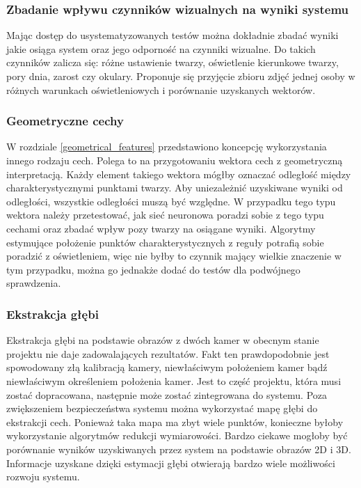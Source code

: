 \documentclass[oneside, eng]{mgr}
\begin{document}
\subsubsection{Zbadanie wpływu czynników wizualnych na wyniki systemu}
Mając dostęp do usystematyzowanych testów można dokładnie zbadać wyniki jakie osiąga system oraz jego odporność na czynniki wizualne. Do takich czynników zalicza się: różne ustawienie twarzy, oświetlenie kierunkowe twarzy, pory dnia, zarost czy okulary. Proponuje się przyjęcie zbioru zdjęć jednej osoby w różnych warunkach oświetleniowych i porównanie uzyskanych wektorów.

\subsubsection{Geometryczne cechy}
W rozdziale \ref{geometrical_features} przedstawiono koncepcję wykorzystania innego rodzaju cech. Polega to na przygotowaniu wektora cech z geometryczną interpretacją. Każdy element takiego wektora mógłby oznaczać odległość między charakterystycznymi punktami twarzy. Aby uniezależnić uzyskiwane wyniki od odległości, wszystkie odległości muszą być względne. W przypadku tego typu wektora należy przetestować, jak sieć neuronowa poradzi sobie z tego typu cechami oraz zbadać wpływ pozy twarzy na osiągane wyniki. Algorytmy estymujące położenie punktów charakterystycznych z reguły potrafią sobie poradzić z oświetleniem, więc nie byłby to czynnik mający wielkie znaczenie w tym przypadku, można go jednakże dodać do testów dla podwójnego sprawdzenia.

\subsubsection{Ekstrakcja głębi}
Ekstrakcja głębi na podstawie obrazów z dwóch kamer w obecnym stanie projektu nie daje zadowalających rezultatów. Fakt ten prawdopodobnie jest spowodowany złą kalibracją kamery, niewłaściwym położeniem kamer bądź niewłaściwym określeniem położenia kamer. Jest to część projektu, która musi zostać dopracowana, następnie może zostać zintegrowana do systemu. Poza zwiększeniem bezpieczeństwa systemu można wykorzystać mapę głębi do ekstrakcji cech. Ponieważ taka mapa ma zbyt wiele punktów, konieczne byłoby wykorzystanie algorytmów redukcji wymiarowości. Bardzo ciekawe mogłoby być porównanie wyników uzyskiwanych przez system na podstawie obrazów 2D i 3D. Informacje uzyskane dzięki estymacji głębi otwierają bardzo wiele możliwości rozwoju systemu.
\end{document}

